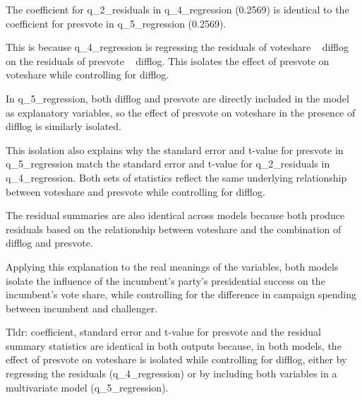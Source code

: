 \documentclass[12pt,letterpaper]{article}
\begin{document}
\begin{enumerate}
		The coefficient for q\_2\_residuals in q\_4\_regression (0.2569) is identical to the coefficient for presvote in q\_5\_regression (0.2569).
		
		This is because q\_4\_regression is regressing the residuals of voteshare ~ difflog on the residuals of presvote ~ difflog. This isolates the effect of presvote on voteshare while controlling for difflog. 
		
		In q\_5\_regression, both difflog and presvote are directly included in the model as explanatory variables, so the effect of presvote on voteshare in the presence of difflog is similarly isolated.
		
		This isolation also explains why the standard error and t-value for presvote in q\_5\_regression match the standard error and t-value for q\_2\_residuals in q\_4\_regression. Both sets of statistics reflect the same underlying relationship between voteshare and presvote while controlling for difflog.
		
		The residual summaries are also identical across models because both produce residuals based on the relationship between voteshare and the combination of difflog and presvote.
		
		Applying this explanation to the real meanings of the variables, both models isolate the influence of the incumbent’s party’s presidential success on the incumbent’s vote share, while controlling for the difference in campaign spending between incumbent and challenger.
		
		Tldr: coefficient, standard error and t-value for presvote and the residual summary statistics are identical in both outputs
		because, in both models, the effect of presvote on voteshare is isolated
		while controlling for difflog, either by regressing the residuals (q\_4\_regression) 
		or by including both variables in a multivariate model (q\_5\_regression).
	\end{enumerate}
\end{document}
